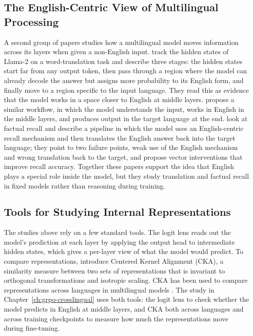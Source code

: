 \subsection{The English-Centric View of Multilingual Processing}
\label{sec:rw-crosslingual-english}

A second group of papers studies how a multilingual model moves information across
its layers when given a non-English input. \citet{wendler2024llamas} track the
hidden states of Llama-2 on a word-translation task and describe three stages: the
hidden states start far from any output token, then pass through a region where
the model can already decode the answer but assigns more probability to its
English form, and finally move to a region specific to the input language. They
read this as evidence that the model works in a space closer to English at middle
layers. \citet{zhao2024multilingualism} propose a similar workflow, in which the
model understands the input, works in English in the middle layers, and produces
output in the target language at the end. \citet{lu2025paths} look at factual
recall and describe a pipeline in which the model uses an English-centric recall
mechanism and then translates the English answer back into the target language;
they point to two failure points, weak use of the English mechanism and wrong
translation back to the target, and propose vector interventions that improve
recall accuracy. Together these papers support the idea that English plays a
special role inside the model, but they study translation and factual recall in
fixed models rather than reasoning during training.

\subsection{Tools for Studying Internal Representations}
\label{sec:rw-crosslingual-tools}

The studies above rely on a few standard tools. The logit lens
\citep{nostalgebraist2020logitlens} reads out the model's prediction at each layer
by applying the output head to intermediate hidden states, which gives a
per-layer view of what the model would predict. To compare representations,
\citet{kornblith2019similarity} introduce Centered Kernel Alignment (CKA), a
similarity measure between two sets of representations that is invariant to
orthogonal transformations and isotropic scaling. CKA has been used to compare
representations across languages in multilingual models
\citep{conneau2020emerging}. The study in Chapter~\ref{ch:grpo-crosslingual} uses
both tools: the logit lens to check whether the model predicts in English at
middle layers, and CKA both across languages and across training checkpoints to
measure how much the representations move during fine-tuning.

